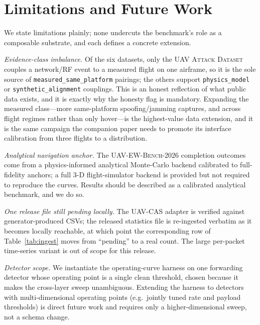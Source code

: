 \documentclass[conference]{IEEEtran}
\newcommand{\dataset}[1]{\textsc{#1}}
\newcommand{\code}[1]{\texttt{#1}}
\begin{document}
\section{Limitations and Future Work}
\label{sec:limitations}
We state limitations plainly; none undercuts the benchmark's role as a
composable substrate, and each defines a concrete extension.

\emph{Evidence-class imbalance.} Of the six datasets, only the \dataset{UAV
Attack Dataset} couples a network/RF event to a measured flight on one airframe,
so it is the sole source of \code{measured\_same\_platform} pairings; the others
support \code{physics\_model} or \code{synthetic\_alignment} couplings. This is
an honest reflection of what public data exists, and it is exactly why the
honesty flag is mandatory. Expanding the measured class---more same-platform
spoofing/jamming captures, and across flight regimes rather than only hover---is
the highest-value data extension, and it is the same campaign the companion
paper needs to promote its interface calibration from three flights to a
distribution.

\emph{Analytical navigation anchor.} The \dataset{UAV-EW-Bench-2026} completion
outcomes come from a physics-informed analytical Monte-Carlo backend calibrated
to full-fidelity anchors; a full 3-D flight-simulator backend is provided but
not required to reproduce the curves. Results should be described as a
calibrated analytical benchmark, and we do so.

\emph{One release file still pending locally.} The \dataset{UAV-CAS} adapter is
verified against generator-produced CSVs; the released statistics file is
re-ingested verbatim as it becomes locally reachable, at which point the
corresponding row of Table~\ref{tab:ingest} moves from ``pending'' to a real
count. The large per-packet time-series variant is out of scope for this
release.

\emph{Detector scope.} We instantiate the operating-curve harness on one
forwarding detector whose operating point is a single clean threshold, chosen
because it makes the cross-layer sweep unambiguous. Extending the harness to
detectors with multi-dimensional operating points (e.g.\ jointly tuned rate and
payload thresholds) is direct future work and requires only a
higher-dimensional sweep, not a schema change.
\end{document}
